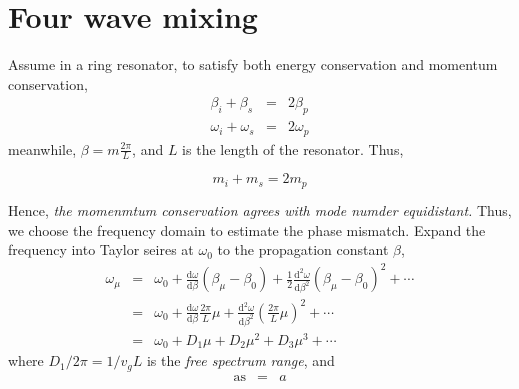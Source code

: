\documentclass[final]{kuee_en}
\newcommand{\mathd}{\mathrm{d}}
\newcommand{\tmname}[1]{\textsc{#1}}
\newcommand{\tmop}[1]{\ensuremath{\operatorname{#1}}}
\newcommand{\tmtextit}[1]{{\itshape{#1}}}
\begin{document}
\section{Four wave mixing}


Assume in a ring resonator, to satisfy both energy conservation and momentum
conservation,
\begin{eqnarray*}
  \beta_i + \beta_s & = & 2 \beta_p\\
  \omega_i + \omega_s & = & 2 \omega_p
\end{eqnarray*}
meanwhile, $\beta = m \frac{2 \pi}{L}$, and $L$ is the length of the
resonator. Thus,

{\tmname{\begin{equation}
  m_i + m_s = 2 m_p
\end{equation}}}

Hence, \tmtextit{the momenmtum conservation agrees with mode numder
equidistant.} Thus, we choose the frequency domain to estimate the phase
mismatch. Expand the frequency into Taylor seires at $\omega_0$ to the
propagation constant $\beta$,
\begin{eqnarray}
  \omega_{\mu} & = & \omega_0 + \frac{\mathd \omega}{\mathd \beta}
  (\beta_{\mu} - \beta_0) + \frac{1}{2}  \frac{\mathd^2 \omega}{\mathd
  \beta^2} (\beta_{\mu} - \beta_0)^2 + \cdots \\
  & = & \omega_0 + \frac{\mathd \omega}{\mathd \beta} \frac{2 \pi}{L} \mu +
  \frac{\mathd^2 \omega}{\mathd \beta^2} \left( \frac{2 \pi}{L} \mu \right)^2
  + \cdots \nonumber\\
  & = & \omega_0 + D_1 \mu + D_2 \mu^2 + D_3 \mu^3 + \cdots \nonumber
\end{eqnarray}
where $D_1 / 2 \pi = 1 / v_g L$ is the \tmtextit{free spectrum range}, and
\begin{eqnarray*}
  \tmop{as} & = & a
\end{eqnarray*}



\end{document}
